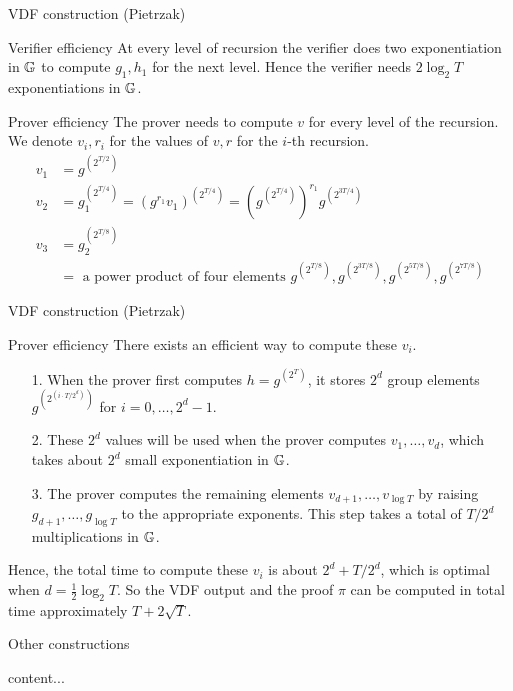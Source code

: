 \documentclass[UTF8]{beamer}
\begin{document}
	\begin{frame}{VDF construction (Pietrzak)}
		\begin{block}{Verifier efficiency}
			At every level of recursion the verifier does two exponentiation in $\mathbb{G}$ to compute $g_1,h_1$ for the next level. Hence the verifier needs $2\log_2T$ exponentiations in $\mathbb{G}$.
		\end{block}
		\begin{block}{Prover efficiency}
			The prover needs to compute $v$ for every level of the recursion. We denote $v_i,r_i$ for the values of $v,r$ for the $i$-th recursion.
			\begin{equation*}
				\begin{aligned}
					v_1&=g^{(2^{T/2})}\\
					v_2&=g_1^{(2^{T/4})}=(g^{r_1}v_1)^{(2^{T/4})}=\left( g^{(2^{T/4})}\right)^{r_1}g^{(2^{3T/4})}\\
					v_3&=g_2^{(2^{T/8})}\\
					&=\text{ a power product of four elements } g^{(2^{T/8})}, g^{(2^{3T/8})}, g^{(2^{5T/8})}, g^{(2^{7T/8})}
				\end{aligned}
			\end{equation*}
		\end{block}
	\end{frame}
	\begin{frame}{VDF construction (Pietrzak)}
		\begin{block}{Prover efficiency}
			There exists an efficient way to compute these $v_i$.
			\begin{enumerate}
				\item [1.] When the prover first computes $h=g^{(2^T)}$, it stores $2^d$ group elements $g^{(2^{(i\cdot T/2^d)})}$ for $i=0,\dots,2^d-1$.
				\item [2.] These $2^d$ values will be used when the prover computes $v_1,\dots,v_d$, which takes about $2^d$ small exponentiation in $\mathbb{G}$.
				\item [3.] The prover computes the remaining elements $v_{d+1},\dots,v_{\log T}$ by raising $g_{d+1},\dots,g_{\log T}$ to the appropriate exponents. This step takes a total of $T/2^d$ multiplications in $\mathbb{G}$.
			\end{enumerate}
			Hence, the total time to compute these $v_i$ is about $2^d+T/2^d$, which is optimal when $d=\frac{1}{2}\log_2 T$. So the VDF output and the proof $\pi$ can be computed in total time approximately $T+2\sqrt{T}$.
		\end{block}
	\end{frame}
	\begin{frame}{Other constructions}
		\begin{block}{}
			content...
		\end{block}
	\end{frame}
\end{document}
